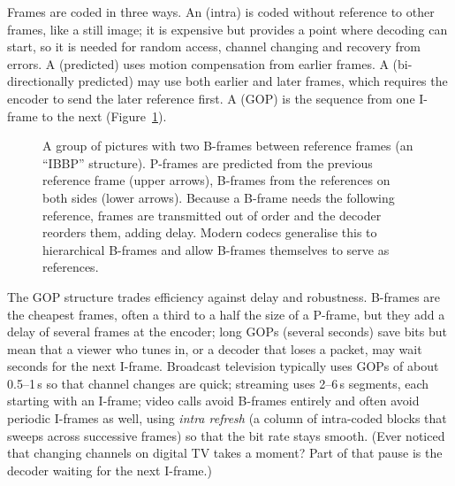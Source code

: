Frames are coded in three ways. An  (intra) is coded without reference to other frames,
like a still image; it is expensive but provides a point where decoding can start, so it is needed
for random access, channel changing and recovery from errors. A  (predicted) uses motion
compensation from earlier frames. A  (bi-directionally predicted) may use both earlier and
later frames, which requires the encoder to send the later reference first. A 
(GOP) is the sequence from one I-frame to the next (Figure~\ref{fig:ch16_gop}).

\begin{figure}[htbp]\centering
{}
\caption{A group of pictures with two B-frames between reference frames (an ``IBBP'' structure).
P-frames are predicted from the previous reference frame (upper arrows), B-frames from the references
on both sides (lower arrows). Because a B-frame needs the following reference, frames are transmitted
out of order and the decoder reorders them, adding delay. Modern codecs generalise this to hierarchical
B-frames and allow B-frames themselves to serve as references.}
\label{fig:ch16_gop}
\end{figure}

The GOP structure trades efficiency against delay and robustness. B-frames are the cheapest frames,
often a third to a half the size of a P-frame, but they add a delay of several frames at the encoder;
long GOPs (several seconds) save bits but mean that a viewer who tunes in, or a decoder that loses a
packet, may wait seconds for the next I-frame. Broadcast television typically uses GOPs of about
0.5--1\,s so that channel changes are quick; streaming uses 2--6\,s segments, each starting with an
I-frame; video calls avoid B-frames entirely and often avoid periodic I-frames as well, using
\emph{intra refresh} (a column of intra-coded blocks that sweeps across successive frames) so that the
bit rate stays smooth. (Ever noticed that changing channels on digital TV takes a moment? Part of that
pause is the decoder waiting for the next I-frame.)

